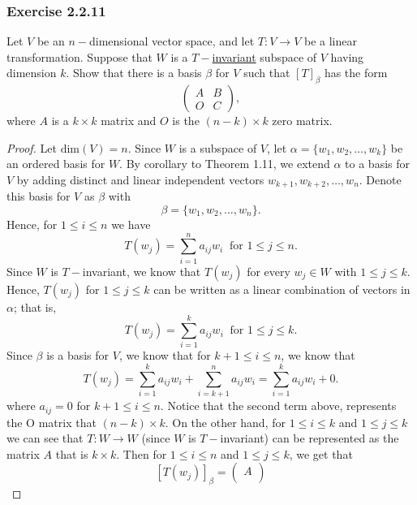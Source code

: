 \subsubsection{Exercise 2.2.11} Let \( V  \) be an \( n- \)dimensional vector space, and let \( T: V \to V  \) be a linear transformation. Suppose that \( W  \) is a {\hyperref[Invariance]{\( T- \)invariant}} subspace of \( V  \) having dimension \( k  \). Show that there is a basis \( \beta  \) for \( V  \) such that \( [T]_{\beta}^{}   \) has the form 
\[  \begin{pmatrix}
    A & B \\
    O & C 
\end{pmatrix}, \]
where \( A  \) is a \( k \times k  \) matrix and \( O  \) is the \( (n-k) \times k  \) zero matrix.
\begin{proof}
    Let \( \text{dim}(V) = n  \). Since \( W  \) is a subspace of \( V  \), let \( \alpha = \{ {w}_{1}, {w}_{2}, \dots, {w}_{k}   \}  \) be an ordered basis for \( W  \). By corollary to Theorem 1.11, we extend \( \alpha  \) to a basis for \( V  \) by adding distinct and linear independent vectors \( {w}_{k+1}, {w}_{k+2}, \dots, {w}_{n} \). Denote this basis for \( V \) as \( \beta \) with 
    \[  \beta = \{ {w}_{1}, {w}_{2}, \dots, {w}_{n} \}.  \]
    Hence, for \( 1 \leq i \leq n  \) we have
    \[  T({w}_{j}) = \sum_{ i=1 }^{ n } {a}_{ij} {w}_{i} \ \text{ for } 1 \leq j \leq n. \]
    Since \( W  \) is \( T- \)invariant, we know that \( T({w}_{j}) \) for every \( {w}_{j} \in W  \) with \( 1 \leq j \leq k  \). Hence, \( T({w}_{j}) \) for \( 1 \leq j \leq  k  \) can be written as a linear combination of vectors in \( \alpha  \); that is, 
    \[  T({w}_{j}) = \sum_{ i=1 }^{ k } {a}_{ij} {w}_{i} \ \text{ for } 1 \leq j \leq k.  \]
    Since \( \beta  \) is a basis for \( V  \), we know that for \( k +1 \leq i \leq  n  \), we know that
    \[  T({w}_{j}) = \sum_{ i=1 }^{ k  } {a}_{ij} {w}_{i} + \sum_{ i=k+1 }^{ n  } {a}_{ij} {w}_{i} = \sum_{ i=1 }^{ k  } {a}_{ij} {w}_{i} + 0.  \] where \( {a}_{ij} = 0  \) for \( k+ 1 \leq i \leq n  \). Notice that the second term above, represents the O matrix that \( (n-k) \times  k  \). On the other hand, for \( 1 \leq i \leq k  \) and \( 1 \leq j \leq k   \) we can see that \( T: W \to W  \) (since \( W  \) is \( T- \)invariant) can be represented as the matrix \( A  \) that is \( k \times  k  \). Then for \( 1 \leq i \leq n  \) and \( 1 \leq j \leq k  \), we get that
    \[ [T({w}_{j})]_{\beta} = \begin{pmatrix}
        A \\

\end{pmatrix}\]
\end{proof}
